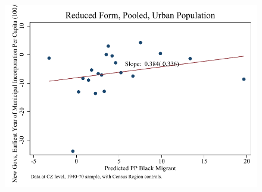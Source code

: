 \documentclass{article}
\begin{document}
\clearpage
\begin{figure}
\centering
\includegraphics{figures/simplefigs/pooled_cgoodman_pc_C3_urban_rf.pdf}
\end{figure}
\clearpage
\end{document}

